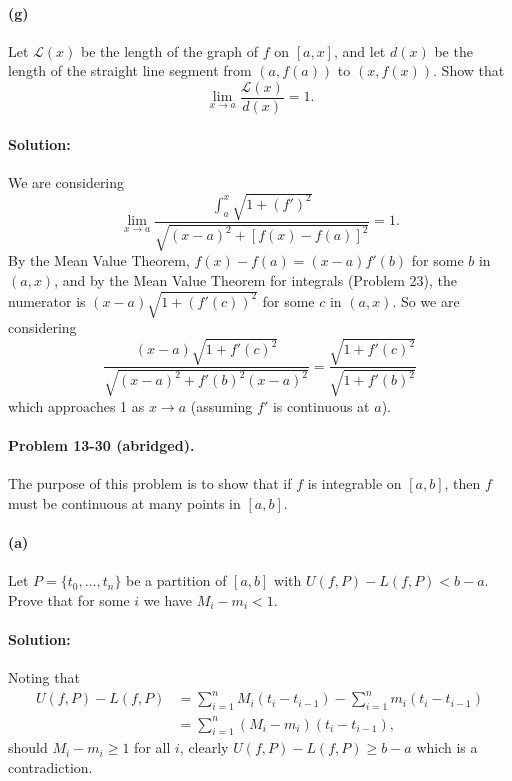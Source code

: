 \documentclass{article}
\begin{document}
\paragraph{(g)} Let $\mathcal{L}(x)$ be the length of the graph of $f$ on $[a,
x]$, and let $d(x)$ be the length of the straight line segment from $(a, f(a))$
to $(x, f(x))$. Show that \begin{equation*}
  \lim_{x \rightarrow a} \frac{\mathcal{L}(x)}{d(x)} = 1.
\end{equation*}

\paragraph{Solution:} We are considering \begin{equation*}
  \lim_{x \rightarrow a} \frac{\int_a^x \sqrt{1 + (f')^2}}{\sqrt{(x - a)^2 +
    [f(x) - f(a)]^2}} = 1.
\end{equation*} By the Mean Value Theorem, $f(x) - f(a) = (x - a)f'(b)$ for
some $b$ in $(a, x)$, and by the Mean Value Theorem for integrals (Problem 23),
the numerator is $(x - a)\sqrt{1 + (f'(c))^2}$ for some $c$ in $(a, x)$. So we
are considering \begin{equation*}
  \frac{(x - a)\sqrt{1 + f'(c)^2}}{\sqrt{(x - a)^2 + f'(b)^2(x - a)^2}}
    = \frac{\sqrt{1 + f'(c)^2}}{\sqrt{1 + f'(b)^2}}
\end{equation*} which approaches 1 as $x \rightarrow a$ (assuming $f'$ is
continuous at $a$).

\paragraph{Problem 13-30 (abridged).} The purpose of this problem is to show
that if $f$ is integrable on $[a, b]$, then $f$ must be continuous at many
points in $[a, b]$.

\paragraph{(a)} Let $P = \{t_0, \ldots, t_n\}$ be a partition of $[a, b]$ with
$U(f, P) - L(f, P) < b - a$. Prove that for some $i$ we have $M_i - m_i < 1$.

\paragraph{Solution:} Noting that \begin{align*}
  U(f, P) - L(f, P) &= \sum_{i = 1}^n M_i(t_i - t_{i - 1}) - \sum_{i = 1}^n m_i
    (t_i - t_{i - 1}) \\
    &= \sum_{i = 1}^n (M_i - m_i)(t_i - t_{i - 1}),
\end{align*} should $M_i - m_i \geq 1$ for all $i$, clearly $U(f, P) - L(f, P)
\geq b - a$ which is a contradiction.
\end{document}
